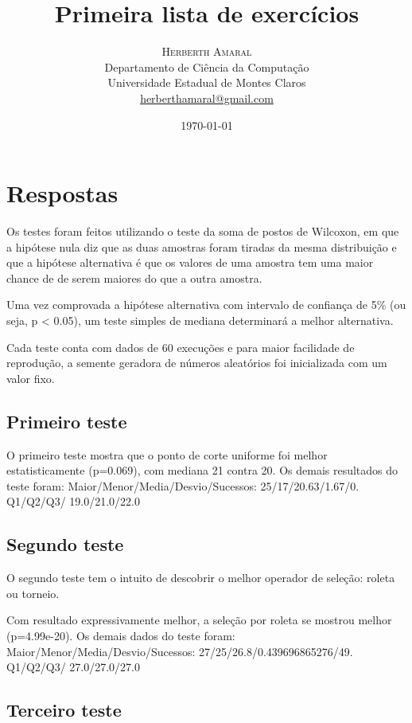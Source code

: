 \documentclass[11pt]{article}
\title{\vspace{.5cm}\fontsize{24pt}{10pt}\selectfont\textbf{\sc Primeira lista de exercícios}} %
\author{
\large
\textsc{Herberth Amaral}\\[2mm]
\normalsize Departamento de Ciência da Computação \\
\normalsize Universidade Estadual de Montes Claros \\
\normalsize \href{mailto:herberthamaral@gmail.com}{herberthamaral@gmail.com}
\vspace{-5mm}
}
\date{\today}
\begin{document}
\maketitle %

\thispagestyle{fancy} %

\section{Respostas}

Os testes foram feitos utilizando o teste da soma de postos de Wilcoxon, em que
a hipótese nula diz que as duas amostras foram tiradas da mesma distribuição e
que a hipótese alternativa é que os valores de uma amostra tem uma maior chance
de de serem maiores do que a outra amostra.

Uma vez comprovada a hipótese alternativa com intervalo de confiança de 5\% (ou
seja, p < 0.05), um teste simples de mediana determinará a melhor alternativa.

Cada teste conta com dados de 60 execuções e para maior facilidade de
reprodução, a semente geradora de números aleatórios foi inicializada com um
valor fixo.

\subsection{Primeiro teste}

O primeiro teste mostra que o ponto de corte uniforme foi melhor
estatisticamente (p=0.069), com mediana 21 contra 20. Os demais resultados do
teste foram: Maior/Menor/Media/Desvio/Sucessos:
25/17/20.63/1.67/0. Q1/Q2/Q3/ 19.0/21.0/22.0

\subsection{Segundo teste}

O segundo teste tem o intuito de descobrir o melhor operador de seleção: roleta ou torneio.

Com resultado expressivamente melhor, a seleção por roleta se mostrou melhor
(p=4.99e-20). Os demais dados do teste foram:
Maior/Menor/Media/Desvio/Sucessos: 27/25/26.8/0.439696865276/49. Q1/Q2/Q3/
27.0/27.0/27.0

\subsection{Terceiro teste}
\end{document}
